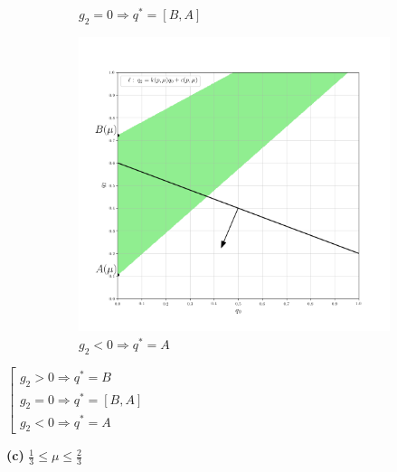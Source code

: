 \begin{flushleft}
\begin{figure}[H]
\begin{subfigure}[b]{0.3 \textwidth}
        	\caption{$g_2 = 0 \Rightarrow q^*=[B,A]$}
        	\label{fig:three sin x}
     	\end{subfigure}
     	\begin{subfigure}[b]{0.3 \textwidth}
        	\centering
        	\includegraphics[width=\textwidth]{images/graf_3_7_2}
        	\caption{$g_2 < 0 \Rightarrow q^*=A$}
        	\label{fig:three sin x}
     	\end{subfigure}
     	\caption{}
	\end{figure}
	
	\begin{center}
		$\left[
		\begin{gathered}
			g_2 > 0 \Rightarrow q^*=B \\
			g_2 = 0 \Rightarrow q^*=[B,A] \\
			g_2 < 0 \Rightarrow q^*=A
		\end{gathered}
		\right.$	
	\end{center}	
	
	\newpage

	\textbf{(c)} $\frac{1}{3} \leqslant \mu \leqslant \frac{2}{3}$
	

\end{flushleft}
